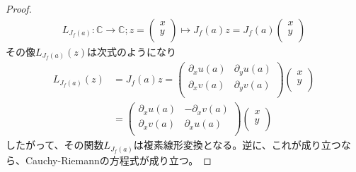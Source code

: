 \documentclass[dvipdfmx]{jsarticle}
\begin{document}
\begin{proof}
\begin{align*}
L_{J_{f}(a)}:\mathbb{C} \rightarrow \mathbb{C};z = \begin{pmatrix}
x \\
y \\
\end{pmatrix} \mapsto J_{f}(a)z = J_{f}(a)\begin{pmatrix}
x \\
y \\
\end{pmatrix}
\end{align*}
その像$L_{J_{f}(a)}(z)$は次式のようになり
\begin{align*}
L_{J_{f}(a)}(z) &= J_{f}(a)z = \begin{pmatrix}
\partial_{x}u(a) & \partial_{y}u(a) \\
\partial_{x}v(a) & \partial_{y}v(a) \\
\end{pmatrix}\begin{pmatrix}
x \\
y \\
\end{pmatrix}\\
&= \begin{pmatrix}
\partial_{x}u(a) & - \partial_{x}v(a) \\
\partial_{x}v(a) & \partial_{x}u(a) \\
\end{pmatrix}\begin{pmatrix}
x \\
y \\
\end{pmatrix}
\end{align*}
したがって、その関数$L_{J_{f}(a)}$は複素線形変換となる。逆に、これが成り立つなら、Cauchy-Riemannの方程式が成り立つ。
\end{proof}
\end{document}
